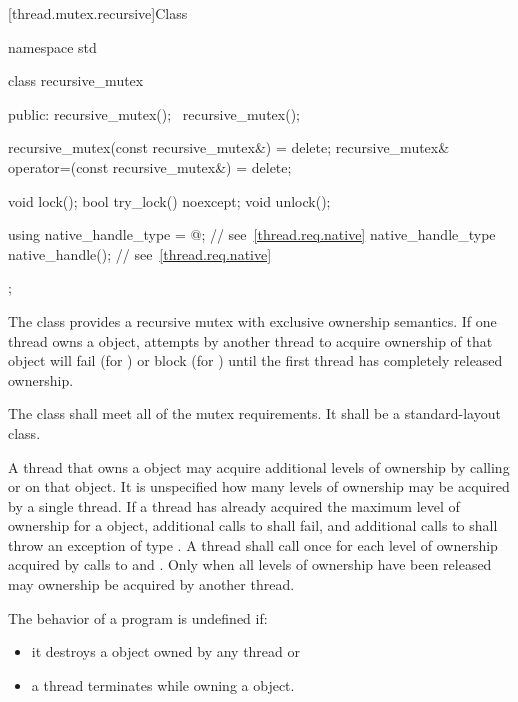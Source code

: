 [thread.mutex.recursive]{Class }

%
\begin{codeblock}
namespace std {
  class recursive_mutex {
  public:
    recursive_mutex();
    ~recursive_mutex();

    recursive_mutex(const recursive_mutex&) = delete;
    recursive_mutex& operator=(const recursive_mutex&) = delete;

    void lock();
    bool try_lock() noexcept;
    void unlock();

    using native_handle_type = @\impdefnc@;          // see~\ref{thread.req.native}
    native_handle_type native_handle();                         // see~\ref{thread.req.native}
  };
}
\end{codeblock}

\pnum
The class  provides a recursive mutex with exclusive ownership
semantics. If one thread owns a  object, attempts by another
thread to acquire ownership of that object will fail (for ) or block
(for ) until the first thread has completely released ownership.

\pnum
The class  shall meet all of the mutex
requirements. It shall be a standard-layout
class.

\pnum
A thread that owns a  object may acquire additional levels of
ownership by calling  or  on that object. It is
unspecified how many levels of ownership may be acquired by a single thread. If a thread
has already acquired the maximum level of ownership for a 
object, additional calls to  shall fail, and additional calls to
 shall throw an exception of type . A thread
shall call  once for each level of ownership acquired by calls to
 and . Only when all levels of ownership have been
released may ownership be acquired by another thread.

\pnum
The behavior of a program is undefined if:

\begin{itemize}
\item it destroys a  object owned by any thread or
\item a thread terminates while owning a  object.
\end{itemize}

